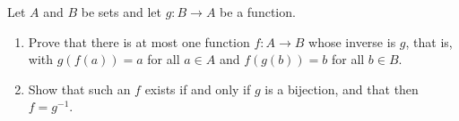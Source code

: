 Let $A$ and $B$ be sets and let $g:B\to A$ be a function.
\begin{enumerate}
\item[(a)] Prove that there is at most one function $f:A\to B$ whose inverse is $g$, that is, with $g(f(a))=a$ for all $a\in A$ and $f(g(b))=b$ for all $b\in B$.
\item[(b)] Show that such an $f$ exists if and only if $g$ is a bijection, and that then $f=g^{-1}$.
\end{enumerate}
